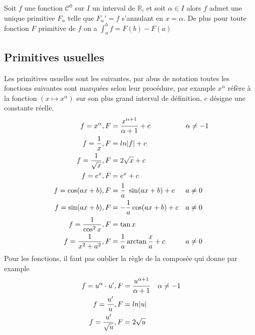\documentclass[11pt,colorlinks]{book}
\theoremstyle{mytheoremstyle}
\theoremstyle{mytheoremstyle}
\theoremstyle{mytheoremstyle}
\theoremstyle{mytheoremstyle}
\theoremstyle{mytheoremstyle}
\theoremstyle{mytheoremstyle}
\theoremstyle{mytheoremstyle}
\theoremstyle{mytheoremstyle}
\theoremstyle{myproblemstyle}
\def\mbb#1{\mathbb{#1}}
\def\bR{\mbb{R}}
\begin{document}
  \begin{theorem}
    Soit $f$ une fonction $\mathcal{C}^0$ sur $I$ un interval de $\bR$, et soit $\alpha \in I$ alors $f$ admet une unique primitive $F_{\alpha}$ 
    telle que $F_{\alpha}' = f$ s'annulant en $x=\alpha$.
    De plus pour toute fonction $F$ primitive de $f$ on a $\int_a^b f = F(b) - F(a)$
  \end{theorem}
  \subsection{Primitives usuelles}
  \begin{prop}
    Les primitives usuelles sont les suivantes, par abus de notation toutes les fonctions suivantes 
    sont marquées selon leur procédure, par example $x^{\alpha}$ réfère à la fonction $(x \mapsto x^{\alpha})$ sur son plus grand interval de 
    définition, $c$ désigne une constante réelle.
    \begin{align*}
      f = x^{\alpha}, F &= \dfrac{x^{\alpha+1}}{\alpha+1} + c && \alpha \not= -1 \\ 
      f = \dfrac{1}{x}, F &= ln \abs{f} + c \\ 
      f = \dfrac{1}{\sqrt{x}}, F &= 2\sqrt{x} + c \\ 
      f = e^x, F &= e^x + c \\
      f = \cos (ax+b), F &= \dfrac{1}{a} \sin (ax+b) + c && a \not= 0 \\ 
      f = \sin (ax+b), F &= - \dfrac{1}{a} \cos(ax+b) + c && a \not= 0 \\
      f = \dfrac{1}{\cos^2 x}, F &= \tan x \\ 
      f = \dfrac{1}{x^2+a^2}, F &= \dfrac{1}{a} \arctan \dfrac{x}{a} + c && a \not= 0 
    \end{align*}
    Pour les fonctions, il faut pas oublier la règle de la composée qui donne par example
    \begin{align*}
      f = u^{\alpha} \cdot u', F &= \dfrac{u^{\alpha+1}}{\alpha+1} && \alpha \not=-1 \\ 
      f = \dfrac{u'}{u}, F &= ln \abs{u} \\
      f = \dfrac{u'}{\sqrt{u}}, F &= 2\sqrt{u}
    \end{align*}
  \end{prop}
\end{document}
